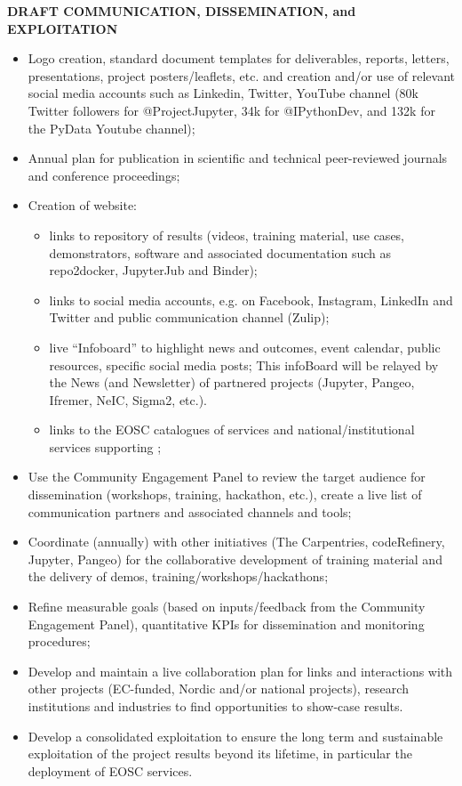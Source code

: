 \begin{framed}

  \centerline{\textbf{ \TheProject DRAFT COMMUNICATION, DISSEMINATION, and EXPLOITATION}}
  {
  \begin{itemize}

\item Logo creation, standard document templates for deliverables, reports, letters, presentations, project posters/leaflets, etc. and creation and/or use of relevant social media accounts such as Linkedin, Twitter, YouTube channel (80k Twitter followers for @ProjectJupyter, 34k for @IPythonDev, and 132k for the PyData Youtube channel);
\item Annual plan for publication in scientific and technical peer-reviewed journals and conference proceedings;
\item Creation of \TheProject website:
\begin{itemize}
\item links to \TheProject repository of results (videos, training material, use cases, demonstrators, software and associated documentation such as repo2docker, JupyterJub and Binder);
\item links to social media accounts, e.g. on Facebook, Instagram, LinkedIn and Twitter and public communication channel (Zulip);
\item live “Infoboard” to highlight news and outcomes, event calendar, public resources, specific social media posts; This infoBoard will be relayed by the News (and Newsletter) of partnered projects (Jupyter, Pangeo, Ifremer, NeIC, Sigma2, etc.).
\item links to the EOSC catalogues of services and national/institutional services supporting \TheProject;
\end{itemize}
\item Use the Community Engagement Panel to review the target audience for dissemination (workshops, training, hackathon, etc.), create a live list of communication partners and associated channels and tools;
\item Coordinate (annually) with other initiatives (The Carpentries, codeRefinery, Jupyter, Pangeo) for the collaborative development of training material and the delivery of demos, training/workshops/hackathons;
\item Refine measurable goals (based on inputs/feedback from the Community
  Engagement Panel), quantitative KPIs for dissemination and monitoring procedures;
\item Develop and maintain a live collaboration plan for links and interactions with other projects (EC-funded, Nordic and/or national projects), research institutions and industries to find opportunities to show-case \TheProject results.
\item Develop a consolidated exploitation to ensure the long term and sustainable exploitation of the project results beyond its lifetime, in particular the deployment of EOSC services.
    \end{itemize}
}
\end{framed}

